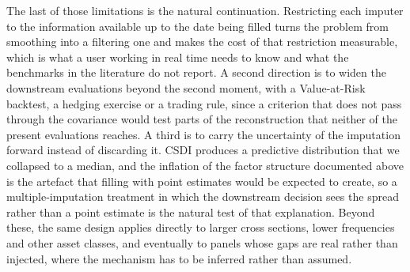 The last of those limitations is the natural continuation. Restricting each
imputer to the information available up to the date being filled turns the
problem from smoothing into a filtering one and makes the cost of that
restriction measurable, which is what a user working in real time needs to know
and what the benchmarks in the literature do not report. A second direction is
to widen the downstream evaluations beyond the second moment, with a
Value-at-Risk backtest, a hedging exercise or a trading rule, since a criterion
that does not pass through the covariance would test parts of the reconstruction
that neither of the present evaluations reaches. A third is to carry the
uncertainty of the imputation forward instead of discarding it. CSDI produces a
predictive distribution that we collapsed to a median, and the inflation of the
factor structure documented above is the artefact that filling with point
estimates would be expected to create, so a multiple-imputation treatment in
which the downstream decision sees the spread rather than a point estimate is the
natural test of that explanation. Beyond these, the same design applies directly to larger cross sections,
lower frequencies and other asset classes, and eventually to panels whose gaps
are real rather than injected, where the mechanism has to be inferred rather
than assumed.
